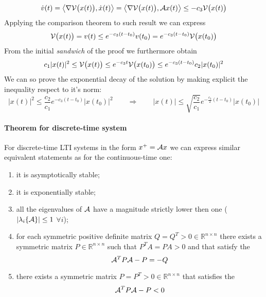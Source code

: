 		\[ \dot v(t) = \big\langle \nabla \mathcal V\big(x(t)\big), \dot x(t) \big\rangle = \big\langle \nabla \mathcal V\big(x(t)\big), \mathcal{A} x(t) \big\rangle \leq - c_3 \mathcal V\big(x(t)\big)  \]
		Applying the comparison theorem to such result we can express
		\[ \mathcal V\big(x(t)\big) = v(t)\leq e^{-c_3(t-t_0)} v(t_0) = e^{-c_3(t-t_0)} \mathcal V \big(x(t_0)\big) \]
		From the initial \textit{sandwich} of the proof we furthermore obtain
		\[ c_1 |x(t)|^2 \leq \mathcal V\big(x(t)\big) \leq e^{-c_3 t} \mathcal V\big(x(t_0)\big) \leq e^{-c_3( t- t_0)} c_2 |x(t_0)|^2 \]
		We can so prove the exponential decay of the solution by making explicit the inequality respect to it's norm:
		\[ |x(t)|^2 \leq \frac{c_2}{c_1} e^{-c_3(t-t_0)} |x(t_0)|^2 \qquad \Rightarrow \qquad |x(t)| \leq \sqrt{\frac{c_2}{c_1}} e^{-\frac {c_3}2 (t-t_0)} |x(t_0)| \]
		
		\paragraph{Theorem for discrete-time system} For discrete-time LTI systems in the form $x^+ = \mathcal{A} x$ we can express similar equivalent statements as for the continuous-time one:
		\begin{enumerate}[\itshape (i)]
			\item it is asymptotically stable;
			\item it is exponentially stable;
			\item all the eigenvalues of $\mathcal{A}$ have a magnitude strictly lower then one ($|\lambda_i\{\mathcal{A}\}|\leq 1$ $\forall i$);
			\item for each symmetric positive definite matrix $Q=Q^T>0 \in \mathds R^{n\times n}$ there exists a symmetric matrix $P\in \mathds R^{n\times n}$ such that $P^T A = PA > 0$ and that satisfy the 
			\[\mathcal{A}^T P \mathcal{A} - P = -Q\]
			\item there exists a symmetric matrix $P = P^T > 0 \in \mathds R^{n\times n}$ that satisfies the 
			\[ \mathcal{A}^T P \mathcal{A} - P < 0 \]
			
		\end{enumerate}
		
		
		
		
		
		
		
		
		
		
		
		
		
		
		
		
		
		
		
		
		
		
		
		
		
		
	
		